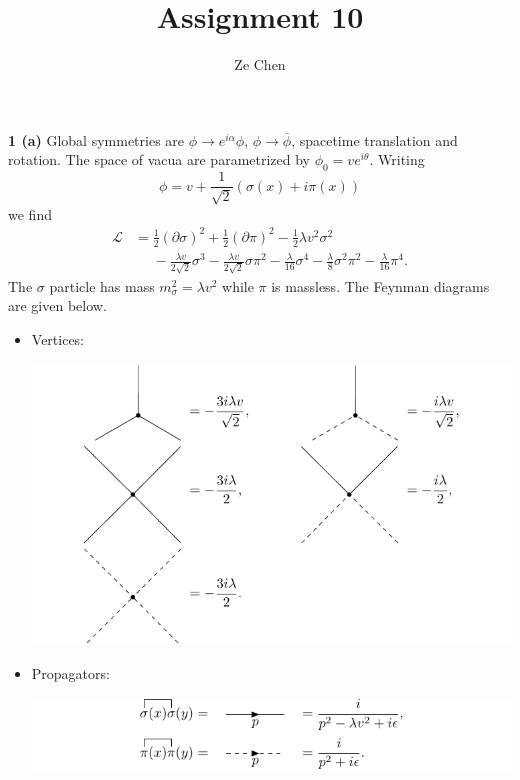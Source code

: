 \documentclass{article}
\title{Assignment 10}
\author{Ze Chen}
\makeatletter
\newcommand*{\shifttext}[1]{%
  \settowidth{\@tempdima}{#1}%
  \hspace{-\@tempdima}#1%
}
\newcommand{\plabel}[1]{%
\shifttext{\textbf{#1}\quad}%
}
\makeatother
\begin{document}
\maketitle

\plabel{1 (a)}%
Global symmetries are $\phi\rightarrow e^{i\alpha}\phi$, $\phi \rightarrow \overline{\phi}$, spacetime translation and rotation.
The space of vacua are parametrized by $\phi_0 = v e^{i\theta}$.
Writing
\[ \phi = v + \frac{1}{\sqrt{2}}(\sigma(x) + i\pi(x)) \]
we find
\begin{align*}
    \mathcal{L} &= \frac{1}{2}(\partial \sigma)^2 + \frac{1}{2}(\partial \pi)^2 - \frac{1}{2} \lambda v^2 \sigma^2 \\
    &\phantom{{}={}} - \frac{\lambda v}{2\sqrt{2}}\sigma^3 - \frac{\lambda v}{2\sqrt{2}} \sigma\pi^2 - \frac{\lambda}{16}\sigma^4 - \frac{\lambda}{8} \sigma^2 \pi^2 - \frac{\lambda}{16}\pi^4.
\end{align*}
The $\sigma$ particle has mass $m_\sigma^2 = \lambda v^2$ while $\pi$ is massless.
The Feynman diagrams are given below.
\begin{itemize}
    \item Vertices:
    \begin{center}
        \includegraphics{img/cartesian/vertex/vertex.pdf}
    \end{center}
    \item Propagators:
    \begin{center}
        \includegraphics{img/cartesian/propagator/propagator.pdf}
    \end{center}
\end{itemize}
\end{document}
